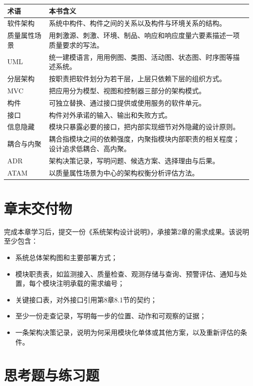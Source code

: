 \begin{longtable}{p{2.6cm}p{10.0cm}}
\toprule
术语 & 本书含义 \\
\midrule
软件架构 & 系统中构件、构件之间的关系以及构件与环境关系的结构。 \\
质量属性场景 & 用刺激源、刺激、环境、制品、响应和响应度量六要素描述一项质量要求的写法。 \\
UML & 统一建模语言，用用例图、类图、活动图、状态图、时序图等描述系统。 \\
分层架构 & 按职责把软件划分为若干层，上层只依赖下层的组织方式。 \\
MVC & 把应用分为模型、视图和控制器三部分的架构模式。 \\
构件 & 可独立替换、通过接口提供或使用服务的软件单元。 \\
接口 & 构件对外承诺的输入、输出和失败方式。 \\
信息隐藏 & 模块只暴露必要的接口，把内部实现细节对外隐藏的设计原则。 \\
耦合与内聚 & 耦合指模块之间的依赖强度，内聚指模块内部职责的相关程度；设计追求低耦合、高内聚。 \\
ADR & 架构决策记录，写明问题、候选方案、选择理由与后果。 \\
ATAM & 以质量属性场景为中心的架构权衡分析评估方法。 \\
\bottomrule
\end{longtable}

\section*{章末交付物}

完成本章学习后，提交一份《系统架构设计说明》，承接第2章的需求成果。该说明至少包含：

\begin{itemize}
\item 系统总体架构图和主要部署方式；
\item 模块职责表，如监测接入、质量检查、观测存储与查询、预警评估、通知与处置，每个模块注明承载的需求编号；
\item 关键接口表，对外接口引用第8章8.1节的契约；
\item 至少一份走查记录，写明每一步的位置、动作和可观察的证据；
\item 一条架构决策记录，说明为何采用模块化单体或其他方案，以及重新评估的条件。
\end{itemize}

\section*{思考题与练习题}

